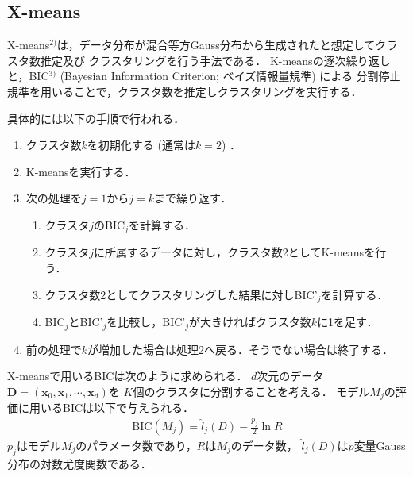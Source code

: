\documentclass[10pt,a4j,twocolumn]{ltjsarticle}
\begin{document}
\subsection{X-means}
X-means$^{2)}$は，データ分布が混合等方Gauss分布から生成されたと想定してクラスタ数推定及び
クラスタリングを行う手法である．
K-meansの逐次繰り返しと，BIC$^{3)}$ (Bayesian Information Criterion; ベイズ情報量規準) による
分割停止規準を用いることで，クラスタ数を推定しクラスタリングを実行する．

具体的には以下の手順で行われる．
\begin{enumerate}
    \item クラスタ数$k$を初期化する (通常は$k=2$) ．
    \item K-meansを実行する．
    \item 次の処理を$j=1$から$j=k$まで繰り返す．
    \begin{enumerate}
        \item クラスタ$j$のBIC$_j$を計算する．
        \item クラスタ$j$に所属するデータに対し，クラスタ数2としてK-meansを行う．
        \item クラスタ数2としてクラスタリングした結果に対しBIC'$_j$を計算する．
        \item BIC$_j$とBIC'$_j$を比較し，BIC'$_j$が大きければクラスタ数$k$に1を足す．
    \end{enumerate}
    \item 前の処理で$k$が増加した場合は処理2へ戻る．そうでない場合は終了する．
\end{enumerate}

X-meansで用いるBICは次のように求められる．
$d$次元のデータ${\bm D}=({\bm x_0}, {\bm x_1}, \cdots, {\bm x_d})$を
$K$個のクラスタに分割することを考える．
モデル$M_j$の評価に用いるBICは以下で与えられる．
\begin{align}
  \label{eq:bic}
  \mathrm{BIC}(M_j) = \hat{l}_j(D) - \frac{p_j}{2}\ln R
\end{align}
$p_j$はモデル$M_j$のパラメータ数であり，$R$は$M_j$のデータ数，
$\hat{l}_j(D)$は$p$変量Gauss分布の対数尤度関数である．
\end{document}
